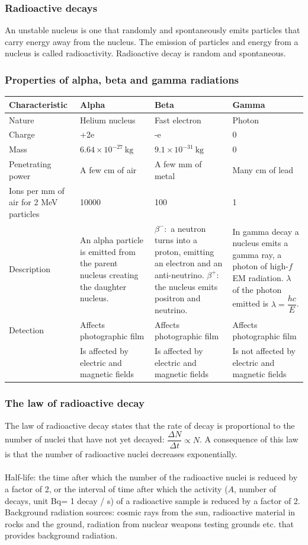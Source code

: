 \documentclass[a4paper,12pt]{article}
\begin{document}
\subsubsection*{Radioactive decays}
An unstable nucleus is one that randomly and spontaneously emits particles that carry energy away from the nucleus.
The emission of particles and energy from a nucleus is called radioactivity. Radioactive decay is random and spontaneous.
\subsubsection*{Properties of alpha, beta and gamma radiations}
\begin{center}
\begin{tabularx}{\textwidth}{@{}|Y |Y |Y| Y|@{}}
\toprule
\textbf{Characteristic} & \textbf{Alpha} & \textbf{Beta} & \textbf{Gamma} \\
\midrule
Nature & Helium nucleus & Fast electron & Photon\\
\midrule
Charge & +2e & -e & 0\\
\midrule
Mass & $6.64\times 10^{-27}\ \text{kg}$ & $9.1\times 10^{-31}\ \text{kg}$ & 0\\
\midrule
Penetrating power & A few cm of air & A few mm of metal & Many cm of lead \\\midrule
Ions per mm of air for 2 MeV particles & 10000 & 100 & 1\\\midrule
Description & An alpha particle is emitted from the parent nucleus creating the daughter nucleus. 
& $\beta^-:$ a neutron turns into a proton, emitting an electron and an anti-neutrino. $\beta^+$: the nucleus emits positron and neutrino. 
& In gamma decay a nucleus emits a gamma ray, a photon of high-$f$ EM radiation. $\lambda$ of the photon emitted is $\lambda=\dfrac{hc}{E}$.\\\midrule
Detection & Affects photographic film & Affects photographic film & Affects photographic film\\
 & Is affected by electric and magnetic fields & Is affected by electric and magnetic fields &Is not affected by electric and magnetic fields\\
\bottomrule
\end{tabularx}
\end{center}
\subsubsection*{The law of radioactive decay}
The law of radioactive decay states that the rate of decay is proportional to the number of nuclei that have not yet decayed: $\dfrac{\Delta N}{\Delta t}\propto N$.
A consequence of this law is that the number of radioactive nuclei decreases exponentially.\\\\
Half-life: the time after which the number of the radioactive nuclei is reduced by a factor of 2, or the interval of time after which the activity ($A$, number of decays, unit Bq= 1 decay / s) of a radioactive sample is reduced by a factor of 2.\\
Background radiation sources: cosmic rays from the sun, radioactive material in rocks and the ground, radiation from nuclear weapons testing grounds etc. that provides background radiation.
\end{document}
